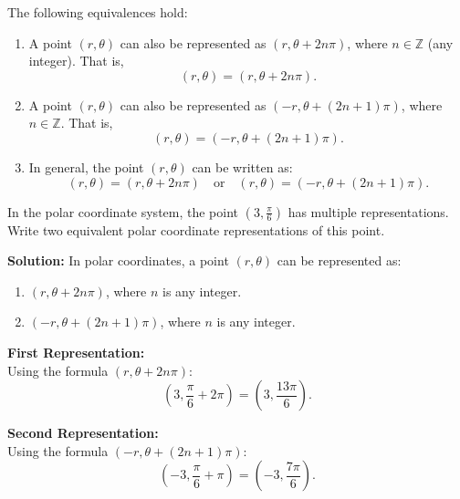 \documentclass[12pt]{article}
\theoremstyle{beautifulthm}
\begin{document}
\newpage
 
 
The following equivalences hold:

\begin{enumerate}
    \item A point \( (r, \theta) \) can also be represented as \( (r, \theta + 2n\pi) \), where \( n \in \mathbb{Z} \) (any integer). That is,
    \[
    (r, \theta) = (r, \theta + 2n\pi).
    \]

    \item A point \( (r, \theta) \) can also be represented as \( (-r, \theta + (2n+1)\pi) \), where \( n \in \mathbb{Z} \). That is,
    \[
    (r, \theta) = (-r, \theta + (2n+1)\pi).
    \]

    \item In general, the point \( (r, \theta) \) can be written as:
    \[
    (r, \theta) = (r, \theta + 2n\pi) \quad \text{or} \quad (r, \theta) = (-r, \theta + (2n+1)\pi).
    \]
\end{enumerate}


\begin{tcolorbox}[colback=examplebg, colframe=red!75!black, title=\textbf{EXAMPLE 1: Equivalent Polar Coordinates}, fonttitle=\bfseries, sharp corners]
In the polar coordinate system, the point \( (3, \frac{\pi}{6}) \) has multiple representations. Write two equivalent polar coordinate representations of this point.


\tcblower
\textbf{Solution:} 
In polar coordinates, a point \( (r, \theta) \) can be represented as:
\begin{enumerate}
    \item \( (r, \theta + 2n\pi) \), where \( n \) is any integer.
    \item \( (-r, \theta + (2n+1)\pi) \), where \( n \) is any integer.
\end{enumerate}

\textbf{First Representation:} \\
Using the formula \( (r, \theta + 2n\pi) \):
\[
(3, \frac{\pi}{6} + 2\pi) = (3, \frac{13\pi}{6}).
\]

\textbf{Second Representation:} \\
Using the formula \( (-r, \theta + (2n+1)\pi) \):
\[
(-3, \frac{\pi}{6} + \pi) = (-3, \frac{7\pi}{6}).
\]
\end{tcolorbox}


\newpage
\end{document}
